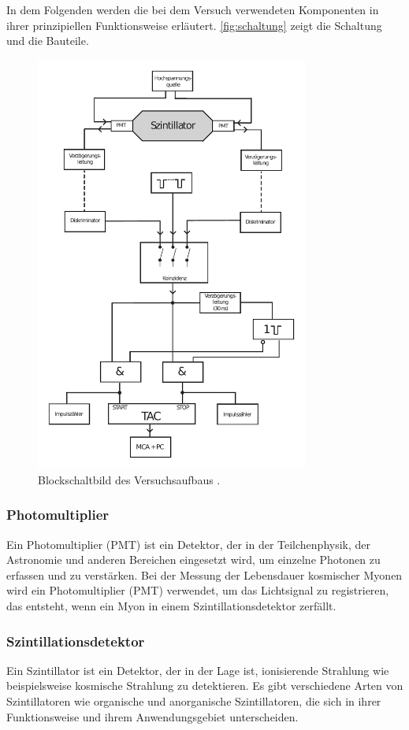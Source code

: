 In dem Folgenden werden die bei dem Versuch verwendeten Komponenten in ihrer prinzipiellen Funktionsweise erläutert.
\autoref{fig:schaltung} zeigt die Schaltung und die Bauteile.
\begin{figure}
    \centering
    \includegraphics[width=0.8\textwidth]{pictures/schaltung.pdf}
    \caption{Blockschaltbild des Versuchsaufbaus \cite[3]{v01}.}
    \label{fig:schaltung}
\end{figure}


\subsubsection*{Photomultiplier}
Ein Photomultiplier (PMT) ist ein Detektor, der in der Teilchenphysik, 
der Astronomie und anderen Bereichen eingesetzt wird, um einzelne Photonen zu erfassen und zu verstärken. 
Bei der Messung der Lebensdauer kosmischer Myonen wird ein Photomultiplier (PMT) verwendet, 
um das Lichtsignal zu registrieren, das entsteht, 
wenn ein Myon in einem Szintillationsdetektor zerfällt. 

\subsubsection*{Szintillationsdetektor}
Ein Szintillator ist ein Detektor, der in der Lage ist, 
ionisierende Strahlung wie beispielsweise kosmische Strahlung zu detektieren. 
Es gibt verschiedene Arten von Szintillatoren wie organische und anorganische Szintillatoren,
die sich in ihrer Funktionsweise und ihrem Anwendungsgebiet unterscheiden.

